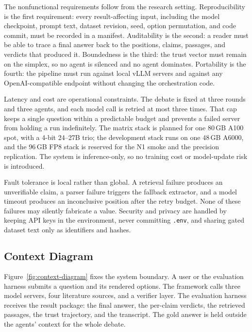 The nonfunctional requirements follow from the research setting. Reproducibility is the first requirement: every result-affecting input, including the model checkpoint, prompt text, dataset revision, seed, option permutation, and code commit, must be recorded in a manifest. Auditability is the second: a reader must be able to trace a final answer back to the positions, claims, passages, and verdicts that produced it. Boundedness is the third: the trust vector must remain on the simplex, so no agent is silenced and no agent dominates. Portability is the fourth: the pipeline must run against local vLLM servers and against any OpenAI-compatible endpoint without changing the orchestration code.

Latency and cost are operational constraints. The debate is fixed at three rounds and three agents, and each model call is retried at most three times. That cap keeps a single question within a predictable budget and prevents a failed server from holding a run indefinitely. The matrix stack is planned for one 80\,GB A100 spot, with a 4-bit 24--27B trio; the development stack runs on one 48\,GB A6000, and the 96\,GB FP8 stack is reserved for the N1 smoke and the precision replication. The system is inference-only, so no training cost or model-update risk is introduced.

Fault tolerance is local rather than global. A retrieval failure produces an unverifiable claim, a parser failure triggers the fallback extractor, and a model timeout produces an inconclusive position after the retry budget. None of these failures may silently fabricate a value. Security and privacy are handled by keeping API keys in the environment, never committing \texttt{.env}, and sharing gated dataset text only as identifiers and hashes.

\subsection{Context Diagram}\label{subsec:context-diagram}

Figure~\ref{fig:context-diagram} fixes the system boundary. A user or the evaluation harness submits a question and its rendered options. The framework calls three model servers, four literature sources, and a verifier layer. The evaluation harness receives the result package: the final answer, the per-claim verdicts, the retrieved passages, the trust trajectory, and the transcript. The gold answer is held outside the agents' context for the whole debate.

